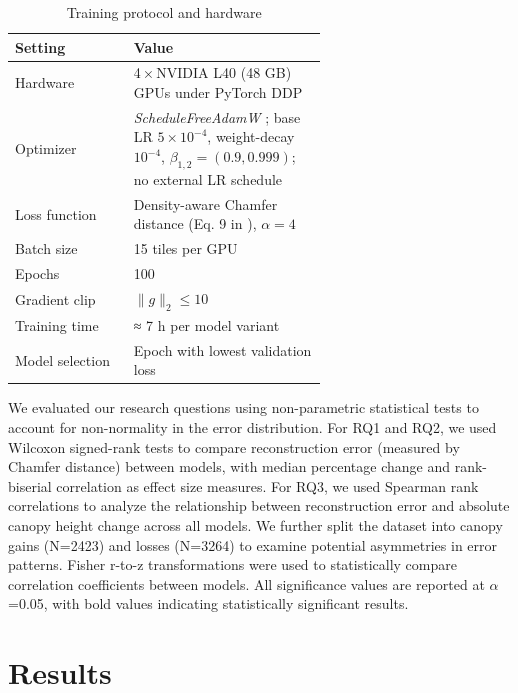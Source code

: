 \documentclass[preprints,article,accept,pdftex,moreauthors]{Definitions/mdpi}
\begin{document}
\begin{table}[htbp]
  \centering
  \caption{Training protocol and hardware}
  \label{tab:training_protocol}
  \begin{tabular}{lp{0.62\linewidth}}
    \toprule
    \textbf{Setting} & \textbf{Value} \\
    \midrule
    Hardware      & 4\,×\,NVIDIA L40 (48 GB) GPUs under PyTorch DDP \\
    Optimizer     & \textit{ScheduleFreeAdamW} \cite{defazio_road_2024}; base LR $5\times10^{-4}$, weight-decay $10^{-4}$, $\beta_{1,2}=(0.9,0.999)$; no external LR schedule \\
    Loss function & Density-aware Chamfer distance (Eq. 9 in \cite{wu_density-aware_2021}), $\alpha=4$ \\
    Batch size    & 15 tiles per GPU \\
    Epochs        & 100 \\
    Gradient clip & $\lVert g\rVert_2 \le 10$ \\
    Training time & ≈ 7 h per model variant \\
    Model selection & Epoch with lowest validation loss \\
    \bottomrule
  \end{tabular}
\end{table}

We evaluated our research questions using non-parametric statistical tests to account for non-normality in the error distribution. For RQ1 and RQ2, we used Wilcoxon signed-rank tests to compare reconstruction error (measured by Chamfer distance) between models, with median percentage change and rank-biserial correlation as effect size measures. For RQ3, we used Spearman rank correlations to analyze the relationship between reconstruction error and absolute canopy height change across all models. We further split the dataset into canopy gains (N=2423) and losses (N=3264) to examine potential asymmetries in error patterns. Fisher r-to-z transformations were used to statistically compare correlation coefficients between models. All significance values are reported at $\alpha$=0.05, with bold values indicating statistically significant results.

\section{Results}
\end{document}
